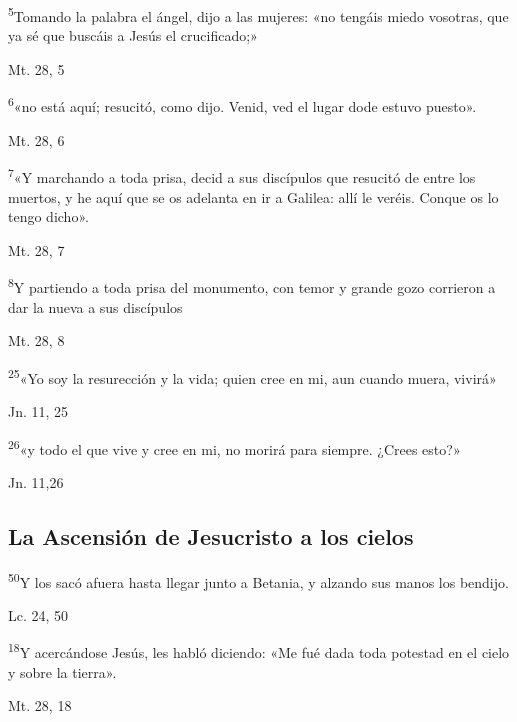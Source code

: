 \documentclass[a4paper,11pt]{article}
\begin{document}
      \textsuperscript{5}Tomando la palabra el ángel, dijo a las mujeres: «no tengáis miedo vosotras, que ya sé que buscáis a Jesús el crucificado;»
      \begin{flushright}
        Mt. 28, 5        
      \end{flushright}

      \textsuperscript{6}«no está aquí; resucitó, como dijo. Venid, ved el lugar dode estuvo puesto».
      \begin{flushright}
        Mt. 28, 6       
      \end{flushright}

      \textsuperscript{7}«Y marchando a toda prisa, decid a sus discípulos que resucitó de entre los muertos, y he aquí que se os adelanta en ir a Galilea:
      allí le veréis. Conque os lo tengo dicho».
      \begin{flushright}
        Mt. 28, 7     
      \end{flushright}

      \textsuperscript{8}Y partiendo a toda prisa del monumento, con temor y grande gozo corrieron a dar la nueva a sus discípulos
      \begin{flushright}
        Mt. 28, 8       
      \end{flushright}

      \textsuperscript{25}«Yo soy la resurección y la vida; quien cree en mi, aun cuando muera, vivirá»
      \begin{flushright}
        Jn. 11, 25    
      \end{flushright}

      \textsuperscript{26}«y todo el que vive y cree en mi, no morirá para siempre. ¿Crees esto?»
      \begin{flushright}
        Jn. 11,26     
      \end{flushright}
    \subsection*{\hfil La Ascensión de Jesucristo a los cielos \hfil}
      
      \textsuperscript{50}Y los sacó afuera hasta llegar junto a Betania, y alzando sus manos los bendijo.
      \begin{flushright}
        Lc. 24, 50     
      \end{flushright}

      \textsuperscript{18}Y acercándose Jesús, les habló diciendo: «Me fué dada toda potestad en el cielo y sobre la tierra».
      \begin{flushright}
        Mt. 28, 18      
      \end{flushright}
\end{document}

